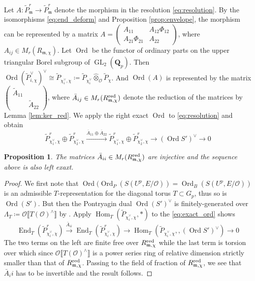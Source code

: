 \documentclass[leqno]{amsart}
\newcommand{\smat}[1]{\left( \begin{smallmatrix} #1 \end{smallmatrix} \right)}
\DeclareMathOperator{\Ord}{Ord}
\newcommand{\red}{\textnormal{red}}
\DeclareMathOperator{\GL}{GL}
\newcommand{\Qp}{\mathbf{Q}_p}
\newcommand{\A}{\mathbf A}
\newcommand{\oo}{\mathcal{O}} %
\newcommand{\fm}{\mathfrak{m}}
\DeclareMathOperator{\End}{End}
\DeclareMathOperator{\Hom}{Hom}
\newtheorem{prop}[thm]{Proposition}
\theoremstyle{definition}
\theoremstyle{remark}
\begin{document}
Let $A\colon \tilde{P}_\fm^r\to \tilde{P}_\fm^r$ 
denote the morphism
in the  resolution \eqref{eq:resolution}.
By the isomorphisms \eqref{eq:end_deform}
and Proposition \ref{prop:envelope},
the morphism 
can be represented by a matrix
$A=\smat{A_{11} & A_{12}\Phi_{12}\\A_{21}\Phi_{21} & A_{22}}$,
where $A_{ij}\in M_r(R_{\fm,\chi})$.
Let $\Ord$ be the functor of ordinary parts
on the upper triangular Borel subgroup of  $\GL_2(\Qp)$.
Then  
$\Ord(\tilde{P}_{i,\chi}^\vee)^\vee\cong 
\tilde{P}_{\chi_i^\vee,\chi}\coloneqq 
\tilde{P}_{\chi_i^\vee}\hat{\otimes}_{\oo}
\tilde{P}_\chi$.
And $\Ord(A)$
is represented by the matrix
$\smat{\tilde{A}_{11} & \\& \tilde{A}_{22}}$,
where $\bar{A}_{ij}\in M_r(R^{\red}_{\fm,\chi})$ denote 
the reduction of the matrices by Lemma \ref{lem:ker_red}.
We apply the right exact $\Ord$ to 
\eqref{eq:resolution} and obtain
\begin{equation}\label{eq:exact_ord}
	\tilde{P}_{\chi_1^\vee,\chi}^r\oplus 
	\tilde{P}_{\chi_2^\vee,\chi}^r
	\xrightarrow{\overline{A}_{11}\oplus\overline{A}_{22}}
	\tilde{P}_{\chi_1^\vee,\chi}^r\oplus 
	\tilde{P}_{\chi_2^\vee,\chi}^r
	\to (\Ord S')^\vee\to 0
\end{equation}


\begin{prop}    
	The matrices 
	$\bar{A}_{ii}\in M_r(R^{\red}_{\fm,\chi})$
	are injective and the sequence above 
	is also left exaxt.
\end{prop}
\begin{proof}
	We first note that 
	$\Ord(\Ord_P(S(U^p,E/\oo))=\Ord_B(S(U^p,E/\oo))$
	is an admissible $T$-representation
	for the diagonal torus $T\subset G_p$,
	thus so is $\Ord(S')$.
	But then the Pontryagin dual 
	$\Ord(S')^\vee$ is finitely-generated
	over  $\Lambda_T\coloneqq
	\oo\llbracket T(\oo)^{\wedge}\rrbracket$
	by \cite[Lem 2.2.11]{emeI}.
	Apply $\Hom_{T}(\tilde{P}_{\chi_i^\vee,\chi},*)$
	to the \eqref{eq:exact_ord} shows
\begin{equation*}
	\End_{T}(\tilde{P}_{\chi_i^\vee,\chi}^r)\xrightarrow{\bar{A}_{ii}}
	\End_{T}(\tilde{P}_{\chi_i^\vee,\chi}^r)\to 
	\Hom_{T}(\tilde{P}_{\chi_i^\vee,\chi}, ,(\Ord S')^\vee)
	\to 0
\end{equation*}
	The two terms on the left 
	are finite free over $R_{\fm,\chi}^{\red}$
	while the last term is torsion over which
	since $\oo\llbracket T(\oo)^{\wedge}\rrbracket$
	is a power series ring of relative dimension
	strictly smaller than that of $R_{\fm,\chi}^{\red}$.
	Passing to the field of fraction of $R_{\fm,\chi}^{\red}$,
	we see that $\bar{A}_ii$ has to be invertible
	and the result follows.
\end{proof}
\end{document}
